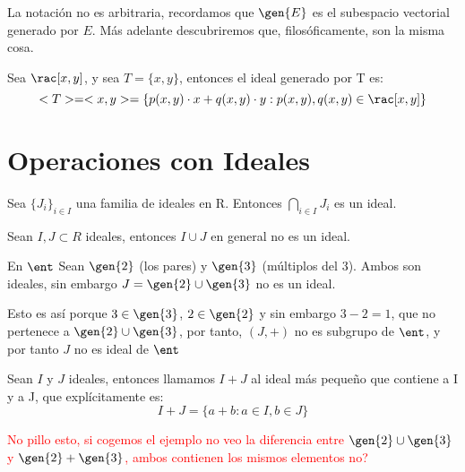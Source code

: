 La notación no es arbitraria, recordamos que $\gen{E}$ es el subespacio vectorial generado por $E$. Más adelante descubriremos que, filosóficamente, son la misma cosa.

\begin{example} Sea $\rac[x,y]$, y sea $T=\{x,y\}$, entonces el ideal generado por T es:
	$$<T> = <x,y>= \{p(x,y)\cdot x+q(x,y)\cdot y : p(x,y),q(x,y) \in \rac[x,y]\}$$
\end{example}

\section{Operaciones con Ideales}

\begin{prop}
	Sea $\{J_i\}_{i\in I}$ una familia de ideales en R. Entonces $\bigcap_{i \in I}J_i$ es un ideal.
\end{prop}


\begin{prop}
	Sean $I,J \subset R$ ideales, entonces $I \cup J$ en general no es un ideal.
\end{prop}

\begin{example} En $\ent$
	Sean $\gen{2}$ (los pares) y $\gen{3}$ (múltiplos del 3). Ambos son ideales, sin embargo $J=\gen{2} \cup \gen{3}$ no es un ideal.

	Esto es así porque $3\in \gen{3}$, $2 \in \gen{2}$ y sin embargo $3-2=1$, que no pertenece a $\gen{2} \cup \gen{3}$, por tanto, $(J,+)$ no es subgrupo de $\ent$, y por tanto $J$ no es ideal de $\ent$
\end{example}

\begin{defn}
Sean $I$ y $J$ ideales, entonces llamamos $I+J$ al ideal más pequeño que contiene a I y a J, que explícitamente es:
$$ I+J = \{a+b: a\in I, b\in J\} $$

\textcolor{red}{No pillo esto, si cogemos el ejemplo no veo la diferencia entre $\gen{2} \cup \gen{3}$ y $\gen{2} + \gen{3}$, ambos contienen los mismos elementos no?}


\end{defn}

